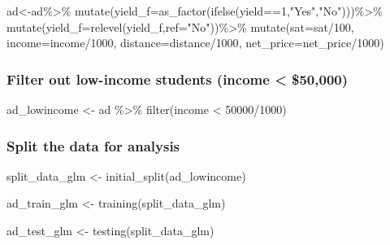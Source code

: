 \documentclass[
]{article}
\newenvironment{Shaded}{\begin{snugshade}}{\end{snugshade}}
\newcommand{\AttributeTok}[1]{\textcolor[rgb]{0.77,0.63,0.00}{#1}}
\newcommand{\DecValTok}[1]{\textcolor[rgb]{0.00,0.00,0.81}{#1}}
\newcommand{\FunctionTok}[1]{\textcolor[rgb]{0.00,0.00,0.00}{#1}}
\newcommand{\NormalTok}[1]{#1}
\newcommand{\OtherTok}[1]{\textcolor[rgb]{0.56,0.35,0.01}{#1}}
\newcommand{\SpecialCharTok}[1]{\textcolor[rgb]{0.00,0.00,0.00}{#1}}
\newcommand{\StringTok}[1]{\textcolor[rgb]{0.31,0.60,0.02}{#1}}
\begin{document}
\begin{Shaded}
\begin{Highlighting}[]
\NormalTok{ad}\OtherTok{\textless{}{-}}\NormalTok{ad}\SpecialCharTok{\%\textgreater{}\%}
  \FunctionTok{mutate}\NormalTok{(}\AttributeTok{yield\_f=}\FunctionTok{as\_factor}\NormalTok{(}\FunctionTok{ifelse}\NormalTok{(yield}\SpecialCharTok{==}\DecValTok{1}\NormalTok{,}\StringTok{"Yes"}\NormalTok{,}\StringTok{"No"}\NormalTok{)))}\SpecialCharTok{\%\textgreater{}\%}
  \FunctionTok{mutate}\NormalTok{(}\AttributeTok{yield\_f=}\FunctionTok{relevel}\NormalTok{(yield\_f,}\AttributeTok{ref=}\StringTok{"No"}\NormalTok{))}\SpecialCharTok{\%\textgreater{}\%}
    \FunctionTok{mutate}\NormalTok{(}\AttributeTok{sat=}\NormalTok{sat}\SpecialCharTok{/}\DecValTok{100}\NormalTok{,}
         \AttributeTok{income=}\NormalTok{income}\SpecialCharTok{/}\DecValTok{1000}\NormalTok{,}
         \AttributeTok{distance=}\NormalTok{distance}\SpecialCharTok{/}\DecValTok{1000}\NormalTok{,}
         \AttributeTok{net\_price=}\NormalTok{net\_price}\SpecialCharTok{/}\DecValTok{1000}\NormalTok{)}
\end{Highlighting}
\end{Shaded}

\hypertarget{filter-out-low-income-students-income-50000}{%
\subsubsection{Filter out low-income students (income \textless{}
\$50,000)}\label{filter-out-low-income-students-income-50000}}

\begin{Shaded}
\begin{Highlighting}[]
\NormalTok{ad\_lowincome }\OtherTok{\textless{}{-}}\NormalTok{ ad }\SpecialCharTok{\%\textgreater{}\%}
  \FunctionTok{filter}\NormalTok{(income }\SpecialCharTok{\textless{}} \DecValTok{50000}\SpecialCharTok{/}\DecValTok{1000}\NormalTok{)}
\end{Highlighting}
\end{Shaded}

\hypertarget{split-the-data-for-analysis}{%
\subsubsection{Split the data for
analysis}\label{split-the-data-for-analysis}}

\begin{Shaded}
\begin{Highlighting}[]
\NormalTok{split\_data\_glm }\OtherTok{\textless{}{-}} \FunctionTok{initial\_split}\NormalTok{(ad\_lowincome)}

\NormalTok{ad\_train\_glm }\OtherTok{\textless{}{-}} \FunctionTok{training}\NormalTok{(split\_data\_glm)}

\NormalTok{ad\_test\_glm }\OtherTok{\textless{}{-}} \FunctionTok{testing}\NormalTok{(split\_data\_glm)}
\end{Highlighting}
\end{Shaded}
\end{document}
